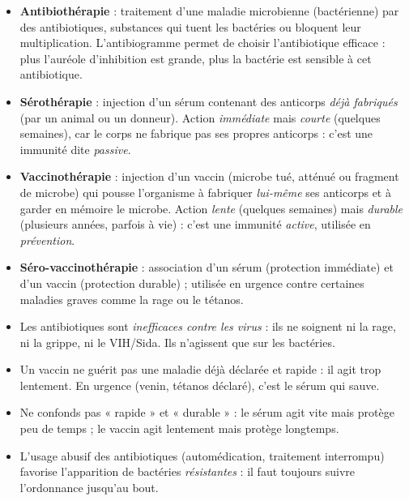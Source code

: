 \documentclass[11pt]{article}
\newcommand{\cle}[1]{{\popxbold\color{popdark}#1}}
\begin{document}
\begin{aretenir}
\begin{itemize}
\item \textbf{Antibiothérapie} : traitement d'une maladie microbienne (bactérienne) par des \cle{antibiotiques}, substances qui tuent les bactéries ou bloquent leur multiplication. L'\cle{antibiogramme} permet de choisir l'antibiotique efficace : plus l'auréole d'inhibition est grande, plus la bactérie est sensible à cet antibiotique.
\item \textbf{Sérothérapie} : injection d'un \cle{sérum} contenant des anticorps \emph{déjà fabriqués} (par un animal ou un donneur). Action \emph{immédiate} mais \emph{courte} (quelques semaines), car le corps ne fabrique pas ses propres anticorps : c'est une immunité dite \emph{passive}.
\item \textbf{Vaccinothérapie} : injection d'un \cle{vaccin} (microbe tué, atténué ou fragment de microbe) qui pousse l'organisme à fabriquer \emph{lui-même} ses anticorps et à garder en mémoire le microbe. Action \emph{lente} (quelques semaines) mais \emph{durable} (plusieurs années, parfois à vie) : c'est une immunité \emph{active}, utilisée en \emph{prévention}.
\item \textbf{Séro-vaccinothérapie} : association d'un sérum (protection immédiate) et d'un vaccin (protection durable) ; utilisée en urgence contre certaines maladies graves comme la rage ou le tétanos.
\end{itemize}
\end{aretenir}

\begin{attention}
\begin{itemize}
\item Les antibiotiques sont \emph{inefficaces contre les virus} : ils ne soignent ni la rage, ni la grippe, ni le VIH/Sida. Ils n'agissent que sur les bactéries.
\item Un vaccin ne guérit pas une maladie déjà déclarée et rapide : il agit trop lentement. En urgence (venin, tétanos déclaré), c'est le sérum qui sauve.
\item Ne confonds pas « rapide » et « durable » : le sérum agit vite mais protège peu de temps ; le vaccin agit lentement mais protège longtemps.
\item L'usage abusif des antibiotiques (automédication, traitement interrompu) favorise l'apparition de bactéries \emph{résistantes} : il faut toujours suivre l'ordonnance jusqu'au bout.
\end{itemize}
\end{attention}
\end{document}
